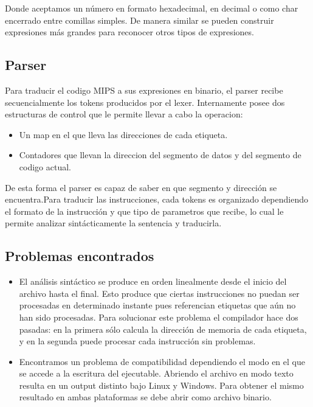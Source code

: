 \documentclass[12pt]{article}
\begin{document}
Donde aceptamos un número en formato hexadecimal, en decimal o como char encerrado entre comillas simples. De manera similar se pueden construir expresiones más grandes para reconocer otros tipos de expresiones.

\subsection{Parser}

Para traducir el codigo MIPS a sus expresiones en binario, el parser recibe secuencialmente los tokens producidos por el lexer.
Internamente posee dos estructuras de control que le permite llevar a cabo la operacion:
\begin{itemize}
	\item Un map en el que lleva las direcciones de cada etiqueta.
	\item Contadores que llevan la direccion del segmento de datos y del segmento de codigo actual.
\end{itemize}
De esta forma el parser es capaz de saber en que segmento y dirección  se encuentra.Para traducir las instrucciones,
cada tokens es organizado dependiendo el formato de la instrucción y que tipo de parametros que recibe, lo cual le permite analizar
sintácticamente la sentencia y traducirla.


\subsection{Problemas encontrados}

\begin{itemize}

\item	El análisis sintáctico se produce en orden linealmente desde el inicio del archivo hasta el final. Esto produce que ciertas instrucciones no puedan ser procesadas en determinado instante pues referencian etiquetas que aún no han sido procesadas. Para solucionar este problema el compilador hace dos pasadas: en la primera sólo calcula la dirección de memoria de cada etiqueta, y en la segunda puede procesar cada instrucción sin problemas.

\item    Encontramos un problema de compatibilidad dependiendo el modo en el que se accede a la escritura del ejecutable. Abriendo el archivo en modo texto resulta en un output distinto bajo Linux y Windows. Para obtener el mismo resultado en ambas plataformas se debe abrir como archivo binario.
    
\end{itemize}
\end{document}
